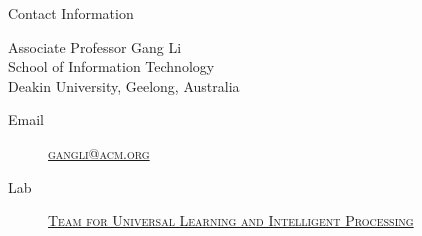 \documentclass[
 size=14pt,
 paper=smartboard,  %
 mode=present, 		%
 display=slides, 	%
 style=tuliplab,  	%
 pauseslide,
 fleqn,leqno]{powerdot}
\begin{document}
\begin{wideslide}[toc=,bm=]{Contact Information}
\centering
{}
\twocolumn[
lcolwidth=0.35\linewidth,
rcolwidth=0.65\linewidth
]
{
}
{
Associate Professor Gang Li\\
School of Information Technology\\
Deakin University, Geelong, Australia
\begin{description}
 \item[Email] \href{mailto:gangli@acm.org}
 {\textsc{\footnotesize{gangli@acm.org}}}

 \item[Lab] \href{http://www.tulip.org.au}
 {\textsc{\footnotesize{Team for Universal Learning and Intelligent Processing}}}
\end{description}
}
\end{wideslide}
\end{document}
